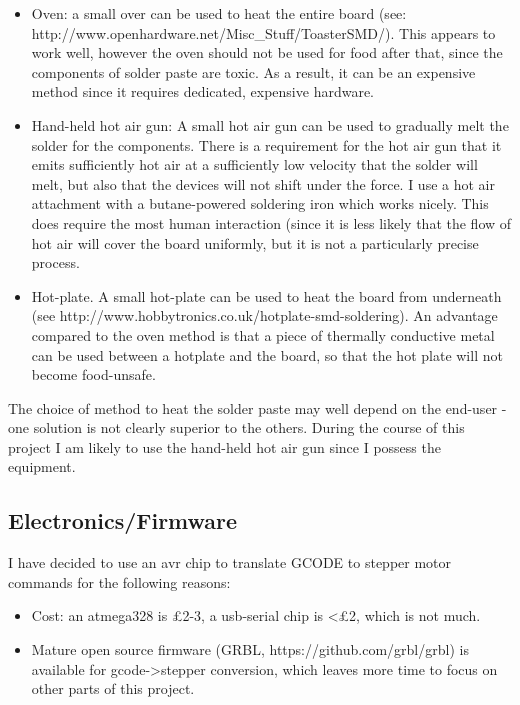 \documentclass[a4paper,11pt]{article}  %
\begin{document}
\begin{itemize} \itemsep0em
	\item	Oven: a small over can be used to heat the entire board (see: http://www.openhardware.net/Misc\_Stuff/ToasterSMD/). This appears to
			work well, however the oven should not be used for food after that, since the components of solder paste are toxic. As a result,
			it can be an expensive method since it requires dedicated, expensive hardware.
	\item	Hand-held hot air gun: A small hot air gun can be used to gradually melt the solder for the components. There is a requirement
			for the hot air gun that it emits sufficiently hot air at a sufficiently low velocity that the solder will melt, but also that
			the devices will not shift under the force. I use a hot air attachment with a butane-powered soldering iron which works nicely.
			This does require the most human interaction (since it is less likely that the flow of hot air will cover the board uniformly, but it
			is not a particularly precise process.
	\item	Hot-plate. A small hot-plate can be used to heat the board from underneath (see http://www.hobbytronics.co.uk/hotplate-smd-soldering).
			An advantage compared to the oven method is that a piece of thermally conductive metal can be used between a hotplate and the board, so
			that the hot plate will not become food-unsafe. 
\end{itemize}
			
The choice of method to heat the solder paste may well depend on the end-user - one solution is not clearly superior to the others. During the
course of this project I am likely to use the hand-held hot air gun since I possess the equipment.

\subsection{Electronics/Firmware}
I have decided to use an avr chip to translate GCODE to stepper motor commands for the following reasons:
\begin{itemize} \itemsep0em
	\item	Cost: an atmega328 is £2-3, a usb-serial chip is <£2, which is not much.
	\item	Mature open source firmware (GRBL, https://github.com/grbl/grbl) is available for gcode-\textgreater stepper
		conversion, which leaves more time to focus on other parts of this project.
\end{itemize}
\end{document}
